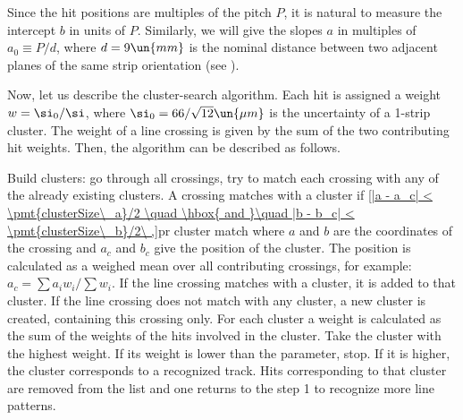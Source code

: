 Since the hit positions are multiples of the pitch $P$, it is natural to measure the intercept $b$ in units of $P$. Similarly, we will give the slopes $a$ in multiples of $a_0 \equiv P / d$, where $d = 9 \un{mm}$ is the nominal distance between two adjacent planes of the same strip orientation (see ).


Now, let us describe the cluster-search algorithm. Each hit is assigned a weight $w = \si_0/\si$, where $\si_0 = 66/\sqrt{12} \un{\mu m}$ is the uncertainty of a 1-strip cluster. The weight of a line crossing is given by the sum of the two contributing hit weights. Then, the algorithm can be described as follows.

\bitm
\itm Build clusters: go through all crossings, try to match each crossing with any of the already existing clusters. A crossing matches with a cluster if
\eqref{|a - a_c| < \pmt{clusterSize\_a}/2 \quad \hbox{ and }\quad |b - b_c| < \pmt{clusterSize\_b}/2\ ,}{pr cluster match}
where $a$ and $b$ are the coordinates of the crossing and $a_c$ and $b_c$ give the position of the cluster. The position is calculated as a weighed mean over all contributing crossings, for example: $a_c = \sum a_i w_i / \sum w_i$. If the line crossing matches with a cluster, it is added to that cluster. If the line crossing does not match with any cluster, a new cluster is created, containing this crossing only.
\itm For each cluster a weight is calculated as the sum of the weights of the hits involved in the cluster.
\itm Take the cluster with the highest weight. If its weight is lower than the  parameter, stop. If it is higher, the cluster corresponds to a recognized track. Hits corresponding to that cluster are removed from the list and one returns to the step 1 to recognize more line patterns.
\eitm

